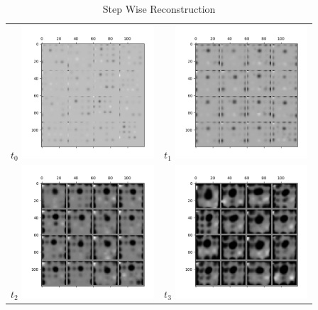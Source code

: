 \documentclass{scrartcl}
\begin{document}
\begin{table}
\caption{Step Wise Reconstruction}
\centering
\label{recon}
\begin{tabular}{cc}
\hline
$t_0$ \includegraphics[width=140pt]{new_0.png} & $t_1$ \includegraphics[width=140pt]{new_1.png}\\
$t_2$ \includegraphics[width=140pt]{new_2.png} & $t_3$ \includegraphics[width=140pt]{new_3.png}\\

\end{tabular}
\end{table}
\end{document}
